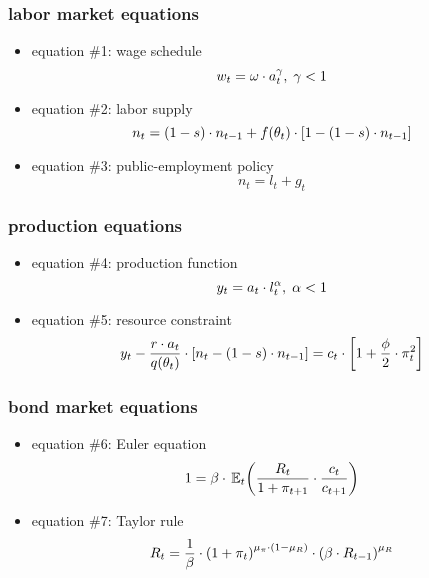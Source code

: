 \documentclass[12pt,xcolor={dvipsnames},hyperref={pdftex,pdfpagemode=UseNone,hidelinks,pdfdisplaydoctitle=true},usepdftitle=false]{beamer}
\begin{document}
\begin{frame}
\frametitle{labor market equations}
\begin{itemize}
\item equation \#1: wage schedule
\begin{equation*}
w_{t}=\omega\cdot a_{t}^{\gamma},\;\gamma<1
\end{equation*}
\item equation \#2: labor supply
\begin{equation*}
n_{t}=(1-s)\cdot n_{t-1}+f(\theta_{t})\cdot \left[ 1-(1-s)\cdot n_{t-1} \right]
\end{equation*}
\item equation \#3: public-employment policy
\begin{equation*}
n_{t}=l_{t}+g_{t}
\end{equation*}
\end{itemize}
\end{frame}


\begin{frame}
\frametitle{production equations}
\begin{itemize}
\item equation \#4: production function
\begin{equation*}
y_{t}=a_{t}\cdot l_{t}^{\alpha},\;\alpha<1
\end{equation*}
\item equation \#5: resource constraint
\begin{equation*}
y_{t}-\frac{r\cdot a_{t}}{q(\theta_{t})}\cdot\left[ n_{t}-(1-s)\cdot n_{t-1} \right]=c_{t}\cdot \left[ 1+\frac{\phi}{2}\cdot \pi_{t}^{2} \right]
\end{equation*}
\end{itemize}
\end{frame}

\begin{frame}
\frametitle{bond market equations}
\begin{itemize}
\item equation \#6: Euler equation
\begin{equation*}
1=\b\cdot \E[t]{\frac{R_{t}}{1+\pi_{t+1}}\cdot\frac{c_{t}}{c_{t+1}}}
\end{equation*}
\item equation \#7: Taylor rule
\begin{equation*}
R_{t}=\frac{1}{\beta}\cdot \left( 1+\pi_{t} \right)^{\mu_{\pi}\cdot (1-\mu_{R})}\cdot \left( \beta\cdot R_{t-1} \right)^{\mu_{R}}
\end{equation*}
\end{itemize}
\end{frame}
\end{document}
